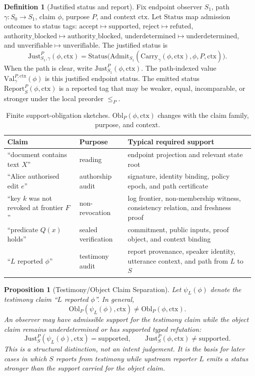 \documentclass[11pt,twoside]{article}
\newcommand{\OGTableFont}{\small}
\newcommand{\OGTableHeaderRow}{\rowcolor{tableheaderbg}}
\newcommand{\TableHeaderRow}{\OGTableHeaderRow}
\newenvironment{OGTable}[2][ht]{%
  \begin{table}[#1]
  \centering
  #2
  \renewcommand{\arraystretch}{1.08}%
  \rowcolors{2}{tablerowbg}{white}%
}{%
  \rowcolors{2}{}{}%
  \end{table}%
}
\newtheorem{proposition}[theorem]{Proposition}
\theoremstyle{definition}
\newtheorem{definition}[theorem]{Definition}
\newcommand{\Obl}{\mathrm{Obl}}
\newcommand{\Carry}{\mathrm{Carry}}
\newcommand{\Admit}{\mathrm{Admit}}
\newcommand{\Just}{\mathrm{Just}}
\newcommand{\Report}{\mathrm{Report}}
\newcommand{\Val}{\mathrm{Val}}
\newcommand{\Status}{\mathrm{Status}}
\newcommand{\ctx}{\mathrm{ctx}}
\newcommand{\supported}{\mathrm{supported}}
\newcommand{\refuted}{\mathrm{refuted}}
\newcommand{\underdetermined}{\mathrm{underdetermined}}
\newcommand{\authorityblocked}{\mathrm{authority\_blocked}}
\newcommand{\unverifiable}{\mathrm{unverifiable}}
\begin{document}
\begin{definition}[Justified status and report]
Fix endpoint observer $S_1$, path $\gamma:S_0\to S_1$, claim $\phi$, purpose
$P$, and context $\ctx$. Let $\Status$ map admission outcomes to status tags:
$\mathrm{accept}\mapsto\supported$,
$\mathrm{reject}\mapsto\refuted$,
$\authorityblocked\mapsto\authorityblocked$,
$\underdetermined\mapsto\underdetermined$, and
$\unverifiable\mapsto\unverifiable$. The justified status is
\[
  \Just_{S_1,\gamma}^P(\phi,\ctx)
  =
  \Status\bigl(
    \Admit_{S_1}(\Carry_\gamma(\phi,\ctx),\phi,P,\ctx)
  \bigr).
\]
When the path is clear, write $\Just_{S_1}^P(\phi,\ctx)$. The path-indexed
value $\Val_\gamma^{P,\ctx}(\phi)$ is this justified endpoint status. The
emitted status $\Report_S^P(\phi,\ctx)$ is a reported tag that may be weaker,
equal, incomparable, or stronger under the local preorder $\leq_P$.
\end{definition}

\begin{OGTable}{\OGTableFont}
\begin{tabular}{>{\raggedright\arraybackslash}p{}>{\raggedright\arraybackslash}p{}>{\raggedright\arraybackslash}p{}}
\toprule
\TableHeaderRow \textbf{Claim} & \textbf{Purpose} & \textbf{Typical required support} \\
\midrule
\enquote{document contains text $X$} & reading & endpoint projection and relevant state root \\
\enquote{Alice authorised edit $e$} & authorship audit & signature, identity binding, policy epoch, and path certificate \\
\enquote{key $k$ was not revoked at frontier $F$} & non-revocation & log frontier, non-membership witness, consistency relation, and freshness proof \\
\enquote{predicate $Q(x)$ holds} & sealed verification & commitment, public inputs, proof object, and context binding \\
\enquote{$L$ reported $\phi$} & testimony audit & report provenance, speaker identity, utterance context, and path from $L$ to $S$ \\
\bottomrule
\end{tabular}
\caption{Finite support-obligation sketches. $\Obl_P(\phi,\ctx)$ changes with the claim family, purpose, and context.}
\label{tab:obligation-sketches}
\end{OGTable}

\begin{proposition}[Testimony/Object Claim Separation]
Let $\psi_L(\phi)$ denote the testimony claim \enquote{$L$ reported $\phi$}.
In general,
\[
  \Obl_P(\psi_L(\phi),\ctx) \neq \Obl_P(\phi,\ctx).
\]
An observer may have admissible support for the testimony claim while the object
claim remains underdetermined or has supported typed refutation:
\[
  \Just_S^P(\psi_L(\phi),\ctx)=\supported,
  \qquad
  \Just_S^P(\phi,\ctx)\neq \supported.
\]
This is a structural distinction, not an intent judgement. It is the basis for
later cases in which $S$ reports from testimony while upstream reporter $L$
emits a status stronger than the support carried for the object claim.
\end{proposition}
\end{document}
